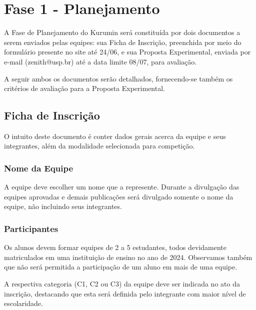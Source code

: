 \section{Fase 1 - Planejamento}
    A Fase de Planejamento do Kurumin será constituída por dois documentos a serem enviados pelas equipes: sua Ficha de Inscrição, preenchida por meio do formulário presente no site até 24/06, e sua Proposta Experimental, enviada por e-mail (zenith@usp.br) até a data limite 08/07, para avaliação.

    A seguir ambos os documentos serão detalhados, fornecendo-se também os critérios de avaliação para a Proposta Experimental.

    \subsection{Ficha de Inscrição}
        O intuito deste documento é conter dados gerais acerca da equipe e seus integrantes, além da modalidade selecionada para competição.
    
        \subsubsection{Nome da Equipe}
            A equipe deve escolher um nome que a represente. Durante a divulgação das equipes aprovadas e demais publicações será divulgado somente o nome da equipe, não incluindo seus integrantes.
            
        \subsubsection{Participantes}
            Os alunos devem formar equipes de 2 a 5 estudantes, todos devidamente matriculados em uma instituição de ensino no ano de 2024. Observamos também que não será permitida a participação de um aluno em mais de uma equipe.

            A respectiva categoria (C1, C2 ou C3) da equipe deve ser indicada no ato da inscrição, destacando que esta será definida pelo integrante com maior nível de escolaridade. 
                
    
